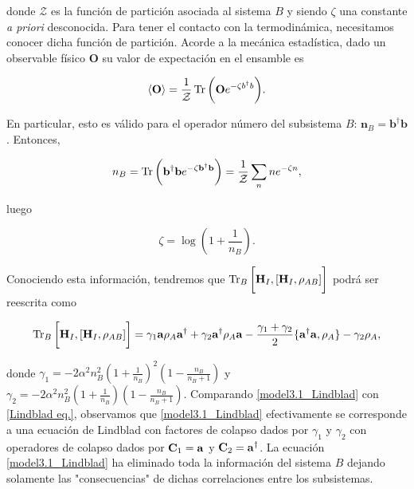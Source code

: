 \documentclass{report} %
\newcommand{\lgg}{\langle}
\newcommand{\rgg}{\rangle}
\numberwithin{equation}{section}
\begin{document}
donde $\mathcal{Z}$ es la función de partición asociada al sistema $B$ y siendo $\zeta$ una constante \textit{a priori} desconocida. Para tener el contacto con la termodinámica, necesitamos conocer dicha función de partición. Acorde a la mecánica estadística, dado un observable físico $\mathbf{O}$ su valor de expectación en el ensamble es 

\begin{equation}
    \lgg \mathbf{O} \rgg = \frac{1}{\mathcal{Z}}\Tr \bigg(\mathbf{O}e^{-\zeta b^{\dagger}b }\bigg).
\end{equation}

En particular, esto es válido para el operador número del subsistema $B$: $\mathbf{n}_B = {\mathbf b}^{\dagger}{\mathbf b}$. Entonces,

\begin{equation}
    n_B = \Tr\bigg({\mathbf b}^{\dagger}{\mathbf b}e^{-\zeta {\mathbf b}^{\dagger}{\mathbf b} }\bigg) = \frac{1}{\mathcal{Z}} \sum_{n} n e^{-\zeta n} ,
\end{equation}

luego

\begin{equation}
    \zeta = \log \left(1 + \frac{1}{n_B}\right).
\end{equation}

Conociendo esta información, tendremos que $\Tr_{B} \bigg[{\bf H}_{I},[{\bf H}_{I},\rho_{AB}]\bigg]$ podrá ser reescrita como

\begin{equation}
\Tr_{B} \bigg[{\bf H}_{I},[{\bf H}_{I},\rho_{AB}]\bigg] = \gamma_1 {\mathbf a}\rho_{A} {\mathbf a}^{\dagger} + \gamma_2 {\mathbf a}^{\dagger} \rho_{A}{\mathbf a} - \frac{\gamma_1 + \gamma_2}{2} \{{\mathbf a}^{\dagger}{\mathbf a},\rho_{A}\} - \gamma_2 \rho_{A},  
\label{model3.1_Lindblad}
\end{equation}

donde $\gamma_1 = -2\alpha^2n_B^2\left(1+\frac{1}{n_B}\right)^2\left(1-\frac{n_B}{n_B+1}\right)$ y $\gamma_2 = -2\alpha^2n_B^2\left(1+\frac{1}{n_B}\right)\left(1-\frac{n_B}{n_B+1}\right)$. Comparando \eqref{model3.1_Lindblad} con \eqref{Lindblad eq.}, observamos que \eqref{model3.1_Lindblad} efectivamente se corresponde a una ecuación de Lindblad con factores de colapso dados por $\gamma_1$ y $\gamma_2$ con operadores de colapso dados por ${\bf C}_1 = {\mathbf a}$ y ${\bf C}_2 = {\mathbf a}^{\dagger}$. La ecuación \eqref{model3.1_Lindblad} ha eliminado toda la información del sistema $B$ dejando solamente las "consecuencias" de dichas correlaciones entre los subsistemas.
\end{document}
